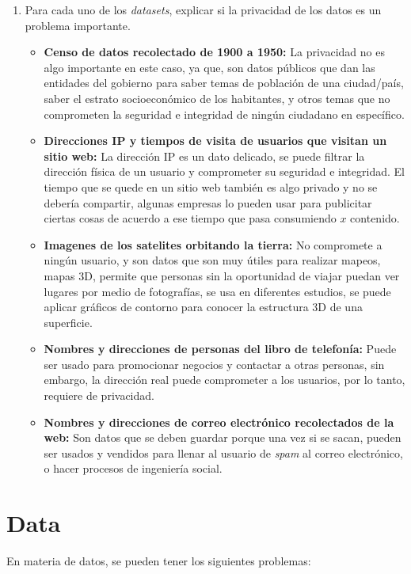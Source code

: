 \documentclass{article}
\begin{document}
\begin{enumerate}
\begin{itemize}
        \end{itemize}
  \item Para cada uno de los \textit{datasets}, explicar si la privacidad de los datos es un problema importante.
        \begin{itemize}
          \item \textbf{Censo de datos recolectado de 1900 a 1950:} La privacidad no es algo importante en este caso, ya que, son datos públicos que dan las entidades del gobierno para saber temas de población de una ciudad/país, saber el estrato socioeconómico de los habitantes, y otros temas que no comprometen la seguridad e integridad de ningún ciudadano en específico.
          \item \textbf{Direcciones IP y tiempos de visita de usuarios que visitan un sitio web:} La dirección IP es un dato delicado, se puede filtrar la dirección física de un usuario y comprometer su seguridad e integridad. El tiempo que se quede en un sitio web también es algo privado y no se debería compartir, algunas empresas lo pueden usar para publicitar ciertas cosas de acuerdo a ese tiempo que pasa consumiendo \(x\) contenido.
          \item \textbf{Imagenes de los satelites orbitando la tierra:} No compromete a ningún usuario, y son datos que son muy útiles para realizar mapeos, mapas 3D, permite que personas sin la oportunidad de viajar puedan ver lugares por medio de fotografías, se usa en diferentes estudios, se puede aplicar gráficos de contorno para conocer la estructura 3D de una superficie.
          \item \textbf{Nombres y direcciones de personas del libro de telefonía:} Puede ser usado para promocionar negocios y contactar a otras personas, sin embargo, la dirección real puede comprometer a los usuarios, por lo tanto, requiere de privacidad.
          \item \textbf{Nombres y direcciones de correo electrónico recolectados de la web:} Son datos que se deben guardar porque una vez si se sacan, pueden ser usados y vendidos para llenar al usuario de \textit{spam} al correo electrónico, o hacer procesos de ingeniería social.
        \end{itemize}
\end{enumerate}

\section{Data}

En materia de datos, se pueden tener los siguientes problemas:
\end{document}
